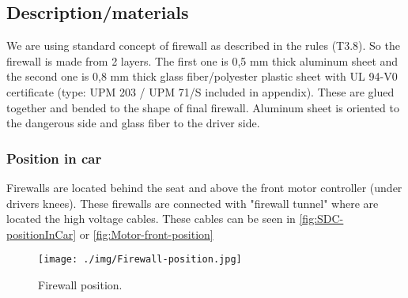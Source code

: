 \subsection{Description/materials}

We are using standard concept of firewall as described in the rules (T3.8). So the firewall is made from 2 layers. The first one is 0,5 mm thick aluminum sheet and the second one is 0,8 mm thick glass fiber/polyester plastic sheet with UL 94-V0 certificate (type: UPM 203 / UPM 71/S included in appendix). These are glued together and bended to the shape of final firewall. Aluminum sheet is oriented to the dangerous side and glass fiber to the driver side.

\subsubsection{Position in car}

Firewalls are located behind the seat and above the front motor controller (under drivers knees). These firewalls are connected with "firewall tunnel" where are located the high voltage cables. These cables can be seen in \ref{fig:SDC-positionInCar} or \ref{fig:Motor-front-position} 

\begin{figure}[H]
	\centering
	\texttt{[image: ./img/Firewall-position.jpg]}
	\caption{Firewall position.}
	\label{fig:Firewall-position}
\end{figure}